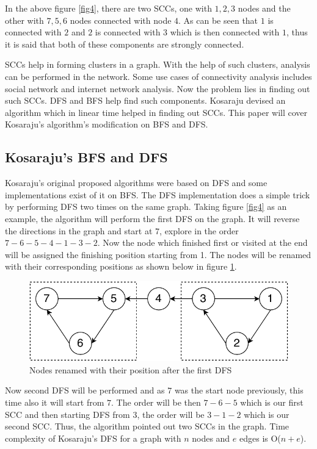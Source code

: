 \documentclass[journal,twoside,web]{ieeecolor}
\begin{document}
In the above figure \ref{fig4}, there are two SCCs, one with {$1, 2, 3$} nodes and the other with {$7, 5, 6$} nodes connected with node $4$. As can be seen that $1$ is connected with $2$ and $2$ is connected with $3$ which is then connected with $1$, thus it is said that both of these components are strongly connected.

SCCs help in forming clusters in a graph. With the help of such clusters, analysis can be performed in the network. Some use cases of connectivity analysis includes social network and internet network analysis. Now the problem lies in finding out such SCCs. DFS and BFS help find such components. Kosaraju devised an algorithm which in linear time helped in finding out SCCs\cite{40}. This paper will cover Kosaraju's algorithm's modification on BFS and DFS.

\subsection{Kosaraju's BFS and DFS}
Kosaraju's original proposed algorithms were based on DFS and some implementations exist of it on BFS. The DFS implementation does a simple trick by performing DFS two times on the same graph. Taking figure \ref{fig4} as an example, the algorithm will perform the first DFS on the graph. It will reverse the directions in the graph and start at $7$, explore in the order $7-6-5-4-1-3-2$. Now the node which finished first or visited at the end will be assigned the finishing position starting from 1. The nodes will be renamed with their corresponding positions as shown below in figure \ref{fig5}. 

\begin{figure}[!h]
    \centerline{\includegraphics[scale=0.75]{figures/scc2.pdf}}
    \caption{Nodes renamed with their position after the first DFS}
    \label{fig5}
\end{figure}

Now second DFS will be performed and as $7$ was the start node previously, this time also it will start from $7$. The order will be then $7-6-5$ which is our first SCC and then starting DFS from $3$, the order will be $3-1-2$ which is our second SCC. Thus, the algorithm pointed out two SCCs in the graph. Time complexity of Kosaraju’s DFS for a graph with $n$ nodes and $e$ edges is O($n + e$).
\end{document}
